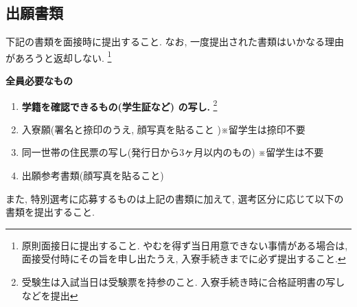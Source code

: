 \documentclass[10pt,b5jsbook,dvips,dvipdfmx,openany]{jsbook}
\theoremstyle{definition}
\begin{document}
\newpage %

		\subsection{出願書類}

 		下記の書類を面接時に提出すること. なお, 一度提出された書類はいかなる理由があろうと返却しない. \footnote{原則面接日に提出すること. やむを得ず当日用意できない事情がある場合は, 面接受付時にその旨を申し出たうえ, 入寮手続きまでに必ず提出すること. }

 		\begin{itembox}[l]{\bf 全員必要なもの}
		\begin{enumerate}
		\item \textbf{学籍を確認できるもの(学生証など) の写し.} \footnote{受験生は入試当日は受験票を持参のこと. 入寮手続き時に合格証明書の写しなどを提出}
		\item 入寮願(署名と捺印のうえ, 顔写真を貼ること )※留学生は捺印不要
		\setcounter{mymemory}{\value{enumi}}
		\item 同一世帯の住民票の写し(発行日から3ヶ月以内のもの) ※留学生は不要
		\item 出願参考書類(顔写真を貼ること)
		\end{enumerate}
		\end{itembox}

		また, 特別選考に応募するものは上記の書類に加えて, 選考区分に応じて以下の書類を提出すること.
\end{document}
